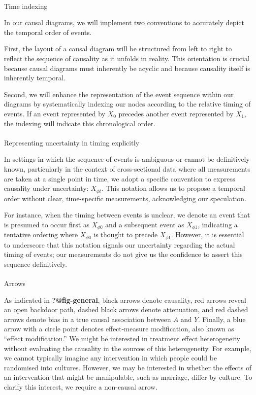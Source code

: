 \documentclass[
  single column]{article}
\makeatletter
\let\oldparagraph\paragraph
\renewcommand{\paragraph}{
    \@ifstar
      \xxxParagraphStar
      \xxxParagraphNoStar
  }
\newcommand{\xxxParagraphStar}[1]{\oldparagraph*{#1}\mbox{}}
\newcommand{\xxxParagraphNoStar}[1]{\oldparagraph{#1}\mbox{}}
\makeatother
\begin{document}
\paragraph{Time indexing}\label{time-indexing}

In our causal diagrams, we will implement two conventions to accurately
depict the temporal order of events.

First, the layout of a causal diagram will be structured from left to
right to reflect the sequence of causality as it unfolds in reality.
This orientation is crucial because causal diagrams must inherently be
acyclic and because causality itself is inherently temporal.

Second, we will enhance the representation of the event sequence within
our diagrams by systematically indexing our nodes according to the
relative timing of events. If an event represented by \(X_0\) precedes
another event represented by \(X_1\), the indexing will indicate this
chronological order.

\paragraph{Representing uncertainty in timing
explicitly}\label{representing-uncertainty-in-timing-explicitly}

In settings in which the sequence of events is ambiguous or cannot be
definitively known, particularly in the context of cross-sectional data
where all measurements are taken at a single point in time, we adopt a
specific convention to express causality under uncertainty:
\(X_{\phi t}\). This notation allows us to propose a temporal order
without clear, time-specific measurements, acknowledging our
speculation.

For instance, when the timing between events is unclear, we denote an
event that is presumed to occur first as \(X_{\phi 0}\) and a subsequent
event as \(X_{\phi 1}\), indicating a tentative ordering where
\(X_{\phi 0}\) is thought to precede \(X_{\phi 1}\). However, it is
essential to underscore that this notation signals our uncertainty
regarding the actual timing of events; our measurements do not give us
the confidence to assert this sequence definitively.

\paragraph{Arrows}\label{arrows}

As indicated in \textbf{?@fig-general}, black arrows denote causality,
red arrows reveal an open backdoor path, dashed black arrows denote
attenuation, and red dashed arrows denote bias in a true causal
association between \(A\) and \(Y\). Finally, a blue arrow with a circle
point denotes effect-measure modification, also known as ``effect
modification.'' We might be interested in treatment effect heterogeneity
without evaluating the causality in the sources of this heterogeneity.
For example, we cannot typically imagine any intervention in which
people could be randomised into cultures. However, we may be interested
in whether the effects of an intervention that might be manipulable,
such as marriage, differ by culture. To clarify this interest, we
require a non-causal arrow.
\end{document}

